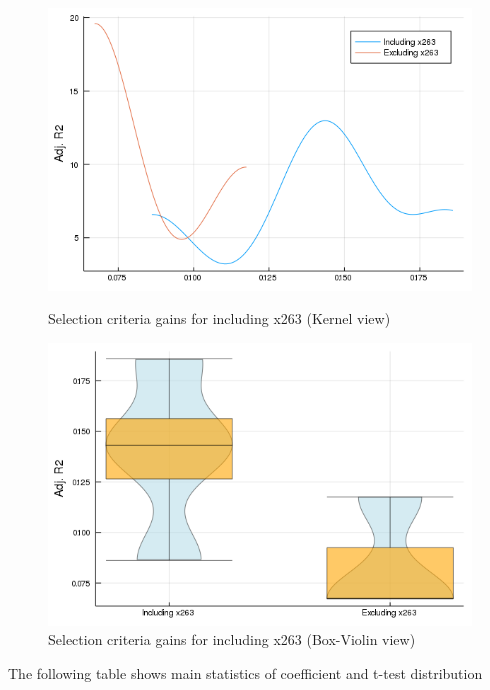 \documentclass{article}
\begin{document}
\begin{figure}[!ht]
  \begin{minipage}[b]{0.48\textwidth}
    \centering
    \includegraphics[width=\textwidth]{Kdensity_criteria_x263.png}
    \caption{Selection criteria gains for including x263 (Kernel view)}
  \end{minipage}
  \hfill
  \begin{minipage}[b]{0.48\textwidth}
    \centering    
    \includegraphics[width=\textwidth]{BoxViolinDot_x263.png}
    \caption{Selection criteria gains for including x263 (Box-Violin view)}    
  \end{minipage}
\end{figure}

\vspace{1cm}

The following table shows main statistics of coefficient and t-test distribution 
\end{document}
